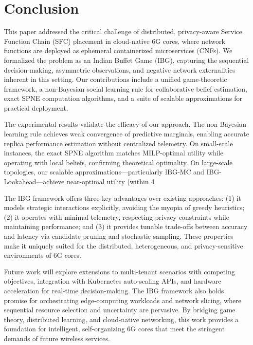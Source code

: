 \documentclass[journal]{IEEEtran}
\theoremstyle{plain}
\theoremstyle{definition}
\theoremstyle{remark}
\begin{document}
\section{Conclusion}
\label{sec:conclusion}

This paper addressed the critical challenge of distributed, privacy-aware Service Function Chain (SFC) placement in cloud-native 6G cores, where network functions are deployed as ephemeral containerized microservices (CNFs). We formalized the problem as an Indian Buffet Game (IBG), capturing the sequential decision-making, asymmetric observations, and negative network externalities inherent in this setting. Our contributions include a unified game-theoretic framework, a non-Bayesian social learning rule for collaborative belief estimation, exact SPNE computation algorithms, and a suite of scalable approximations for practical deployment.

The experimental results validate the efficacy of our approach. The non-Bayesian learning rule achieves weak convergence of predictive marginals, enabling accurate replica performance estimation without centralized telemetry. On small-scale instances, the exact SPNE algorithm matches MILP-optimal utility while operating with local beliefs, confirming theoretical optimality. On large-scale topologies, our scalable approximations—particularly IBG-MC and IBG-Lookahead—achieve near-optimal utility (within 4%

The IBG framework offers three key advantages over existing approaches: (1) it models strategic interactions explicitly, avoiding the myopia of greedy heuristics; (2) it operates with minimal telemetry, respecting privacy constraints while maintaining performance; and (3) it provides tunable trade-offs between accuracy and latency via candidate pruning and stochastic sampling. These properties make it uniquely suited for the distributed, heterogeneous, and privacy-sensitive environments of 6G cores.

Future work will explore extensions to multi-tenant scenarios with competing objectives, integration with Kubernetes auto-scaling APIs, and hardware acceleration for real-time decision-making. The IBG framework also holds promise for orchestrating edge-computing workloads and network slicing, where sequential resource selection and uncertainty are pervasive. By bridging game theory, distributed learning, and cloud-native networking, this work provides a foundation for intelligent, self-organizing 6G cores that meet the stringent demands of future wireless services.
\end{document}
